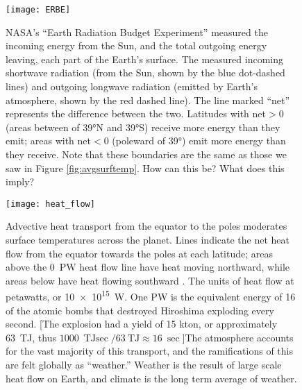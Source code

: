 \begin{figure}[p]
\centering
\texttt{[image: ERBE]}%
\caption{NASA's ``Earth Radiation Budget Experiment'' measured the incoming energy from the Sun, and the total outgoing energy leaving, each part of the Earth's surface. The measured incoming shortwave radiation (from the Sun, shown by the blue dot-dashed lines) and outgoing longwave radiation (emitted by Earth's atmosphere, shown by the red dashed line). The line marked ``net'' represents the difference between the two. Latitudes with net$>0$(areas between of \ang{39}N and \ang{39}S) receive more energy than they emit; areas with net$<0$ (poleward of \ang{39}) emit more energy than they receive. Note that these boundaries are the same as those we saw in Figure \ref{fig:avgsurftemp}. How can this be? What does this imply? }   
\label{fig:erbe}
\end{figure}

%

\begin{figure}[p]
\centering
\texttt{[image: heat\_flow]}%
\caption{Advective heat transport from the equator to the poles moderates surface temperatures across the planet. Lines indicate the net heat flow from the equator towards the poles at each latitude; areas above the \SI{0}{\peta\watt} heat flow line have heat moving northward, while areas below have heat flowing southward . The units of heat flow at petawatts, or \SI{10e15}{\watt}. One \si{\peta\watt} is the equivalent energy of 16 of the atomic bombs that destroyed Hiroshima exploding every second. [The explosion had a yield of 15 kton, or approximately \SI{63}{\tera\joule}, thus $\SI{1000}{\tera\joule\sec}/\SI{63}{\tera\joule}\approx \SI{16}{\sec}$]The atmosphere accounts for the vast majority of this transport, and the ramifications of this are felt globally as ``weather.'' Weather is the result of large scale heat flow on Earth, and climate is the long term average of weather.}   
\label{fig:heatflow}
\end{figure}


